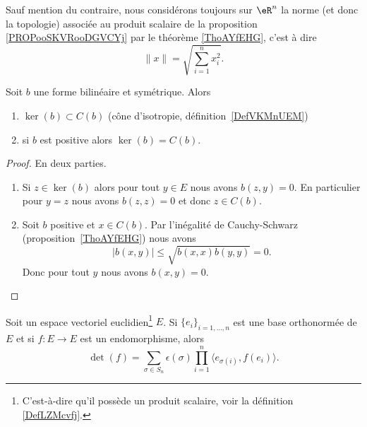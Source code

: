 \begin{definition}        \label{DEFooJAGXooMgaUsR}
	Sauf mention du contraire, nous considérons toujours sur \( \eR^n\) la norme (et donc la topologie) associée au produit scalaire de la proposition \ref{PROPooSKVRooDGVCYj} par le théorème \ref{ThoAYfEHG}, c'est à dire
	\begin{equation}
		\| x \|=\sqrt{ \sum_{i=1}^nx_i^2 }.
	\end{equation}
\end{definition}

\begin{proposition}     \label{PropHIWjdMX}
	Soit \( b\) une forme bilinéaire et symétrique. Alors
	\begin{enumerate}
		\item
		      \( \ker(b)\subset C(b)\) (cône d'isotropie, définition~\ref{DefVKMnUEM})
		\item
		      si \( b\) est positive alors \( \ker(b)=C(b)\).
	\end{enumerate}
\end{proposition}

\begin{proof}
	En deux parties.
	\begin{enumerate}
		\item
		      Si \( z\in\ker(b)\) alors pour tout \( y\in E\) nous avons \( b(z,y)=0\). En particulier pour \( y=z\) nous avons \( b(z,z)=0\) et donc \( z\in C(b)\).
		\item
		      Soit \( b\) positive et \( x\in C(b)\). Par l'inégalité de Cauchy-Schwarz (proposition~\ref{ThoAYfEHG}) nous avons
		      \begin{equation}
			      | b(x,y) |\leq \sqrt{   b(x,x)b(y,y) }=0.
		      \end{equation}
		      Donc pour tout \( y\) nous avons \( b(x,y)=0\).
	\end{enumerate}
\end{proof}


\begin{lemma}       \label{LEMooEZFIooXyYybe}
	Soit un espace vectoriel euclidien\footnote{C'est-à-dire qu'il possède un produit scalaire, voir la définition \ref{DefLZMcvfj}.} \( E\). Si \( \{ e_i \}_{i=1,\ldots, n}\) est une base orthonormée de \( E\) et si \( f\colon E\to E\) est un endomorphisme, alors
	\begin{equation}        \label{EQooQAZLooZutFUz}
		\det(f)=\sum_{\sigma\in S_n}\epsilon(\sigma)\prod_{i=1}^n\langle e_{\sigma(i)}, f(e_i)\rangle.
	\end{equation}
\end{lemma}

